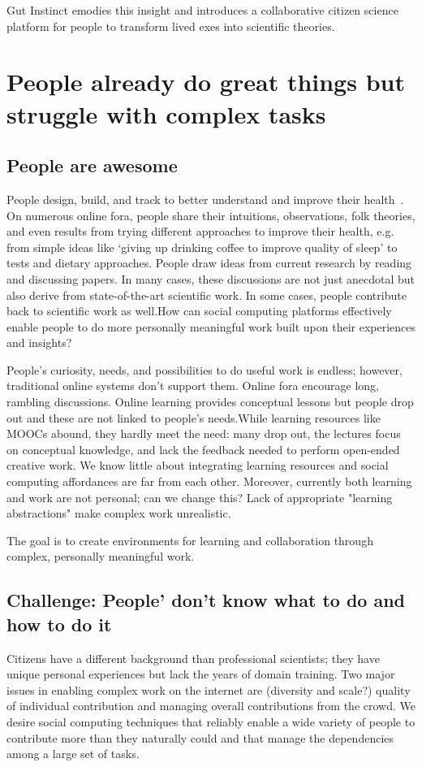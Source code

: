 Gut Instinct emodies this insight and introduces a collaborative citizen science platform for people to transform lived exes into scientific theories. 

\section {People already do great things but struggle with complex tasks}

\subsection{People are awesome}
People design, build, and track to better understand and improve their health~\cite{DanaLewis}. On numerous online fora, people share their intuitions, observations, folk theories, and even results from trying different approaches to improve their health, e.g. from simple ideas like ‘giving up drinking coffee to improve quality of sleep’ to tests and dietary approaches. People draw ideas from current research by reading and discussing papers. In many cases, these discussions are not just anecdotal but also derive from state-of-the-art scientific work. In some cases, people contribute back to scientific work as well.How can social computing platforms effectively enable people to do more personally meaningful work built upon their experiences and insights?

People’s curiosity, needs, and possibilities to do useful work is endless; however, traditional online systems don’t support them. Online fora encourage long, rambling discussions. Online learning provides conceptual lessons but people drop out and these are not linked to people’s needs.While learning resources like MOOCs abound, they hardly meet the need: many drop out, the lectures focus on conceptual knowledge, and lack the feedback needed to perform open-ended creative work. We know little about integrating learning resources and social computing affordances are far from each other. Moreover, currently both learning and work are not personal; can we change this? Lack of appropriate "learning abstractions" make complex work unrealistic.

The goal is to create environments for learning and collaboration through complex, personally meaningful work.

\subsection{Challenge: People' don't know what to do and how to do it}
Citizens have a different background than professional scientists; they have unique
 personal experiences but lack the years of domain training. Two major issues in 
enabling complex work on the internet are (diversity and scale?) 
quality of individual contribution and managing overall contributions from the crowd.
We desire social computing techniques that reliably enable a wide variety of people to 
contribute more than they naturally could and that manage the dependencies among
 a large set of tasks.

